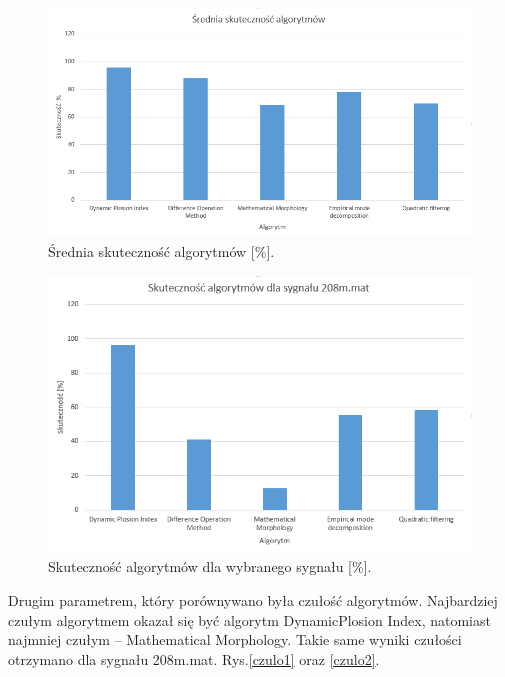 \documentclass[10pt,a4paper]{article}
\begin{document}
\medskip
\begin{figure}[h!]
\centering
\includegraphics[width=\textwidth]{skut1}
\caption{Średnia skuteczność algorytmów [\%]. }
\label{skut1}
\end{figure} 
\FloatBarrier
\medskip

\medskip
\begin{figure}[h!]
\centering
\includegraphics[width=\textwidth]{skut2}
\caption{Skuteczność algorytmów dla wybranego sygnału [\%]. }
\label{skut2}
\end{figure} 
\FloatBarrier
\medskip


Drugim parametrem, który porównywano była czułość algorytmów. Najbardziej czułym algorytmem okazał się być algorytm DynamicPlosion Index, natomiast najmniej czułym – Mathematical Morphology. Takie same wyniki czułości otrzymano dla sygnału 208m.mat. Rys.\ref{czulo1} oraz \ref{czulo2}.
\end{document}
